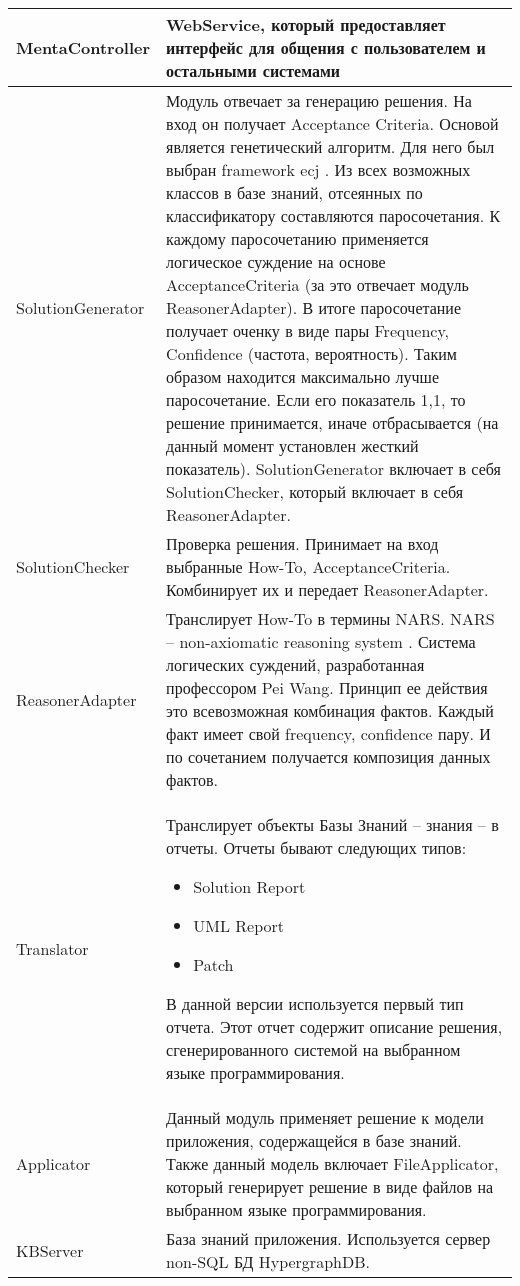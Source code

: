 \begin{longtable}{|p{5cm}|p{10cm}|}
\hline \hline
\endlastfoot
 MentaController & WebService, который предоставляет интерфейс для общения с пользователем и остальными системами \\
  \hline
 SolutionGenerator & Модуль отвечает за генерацию решения. На вход он получает Acceptance Criteria. Основой является генетический алгоритм. Для него был выбран framework ecj \cite{ECJ} . Из всех возможных классов в базе знаний, отсеянных по классификатору составляются паросочетания. К каждому паросочетанию применяется логическое суждение на основе AcceptanceCriteria (за это отвечает модуль ReasonerAdapter). В итоге паросочетание получает оченку в виде пары Frequency, Confidence (частота, вероятность). 
Таким образом находится максимально лучше паросочетание. Если его показатель 1,1, то решение принимается, иначе отбрасывается (на данный момент установлен жесткий показатель).
SolutionGenerator включает в себя SolutionChecker, который включает в себя ReasonerAdapter.
 \\
  \hline
SolutionChecker & Проверка решения. Принимает на вход выбранные How-To, AcceptanceCriteria. Комбинирует их и передает ReasonerAdapter. \\
  \hline
ReasonerAdapter & Транслирует  How-To в термины NARS. NARS – non-axiomatic reasoning system \cite{NARS}. Система логических суждений, разработанная профессором Pei Wang. Принцип ее действия это всевозможная комбинация фактов. Каждый факт имеет свой frequency, confidence пару. И по сочетанием получается композиция данных фактов.\\
  \hline
  Translator & Транслирует объекты Базы Знаний – знания – в отчеты. Отчеты бывают следующих типов:
  \begin{itemize}
  	\item Solution Report
  	\item UML Report
  	\item Patch
  \end{itemize}
В данной версии используется первый тип отчета. Этот отчет содержит описание решения, сгенерированного системой на выбранном языке программирования.
\\
  \hline
  Applicator & Данный модуль применяет решение к модели приложения, содержащейся в базе знаний. Также данный модель включает FileApplicator, который генерирует решение в виде файлов на выбранном языке программирования. \\
  \hline
  KBServer & База знаний приложения. Используется сервер non-SQL БД HypergraphDB. \\
  \hline
\end{longtable}
